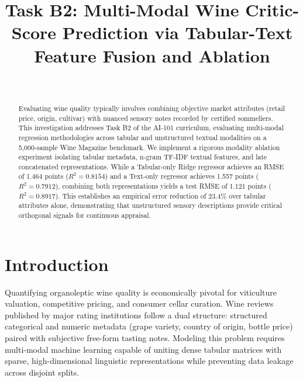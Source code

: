 \documentclass[10pt,journal,compsoc,twocolumn]{IEEEtran}
\begin{document}
\title{Task B2: Multi-Modal Wine Critic-Score Prediction via Tabular-Text Feature Fusion and Ablation}

\author{
    \\
}

\maketitle

\begin{abstract}
Evaluating wine quality typically involves combining objective market attributes (retail price, origin, cultivar) with nuanced sensory notes recorded by certified sommeliers. This investigation addresses Task B2 of the AI-101 curriculum, evaluating multi-modal regression methodologies across tabular and unstructured textual modalities on a 5,000-sample Wine Magazine benchmark. We implement a rigorous modality ablation experiment isolating tabular metadata, n-gram TF-IDF textual features, and late concatenated representations. While a Tabular-only Ridge regressor achieves an RMSE of 1.464 points ($R^2 = 0.8154$) and a Text-only regressor achieves 1.557 points ($R^2 = 0.7912$), combining both representations yields a test RMSE of 1.121 points ($R^2 = 0.8917$). This establishes an empirical error reduction of 23.4\% over tabular attributes alone, demonstrating that unstructured sensory descriptions provide critical orthogonal signals for continuous appraisal.
\end{abstract}

\section{Introduction}
Quantifying organoleptic wine quality is economically pivotal for viticulture valuation, competitive pricing, and consumer cellar curation. Wine reviews published by major rating institutions follow a dual structure: structured categorical and numeric metadata (grape variety, country of origin, bottle price) paired with subjective free-form tasting notes. Modeling this problem requires multi-modal machine learning capable of uniting dense tabular matrices with sparse, high-dimensional linguistic representations while preventing data leakage across disjoint splits.
\end{document}
